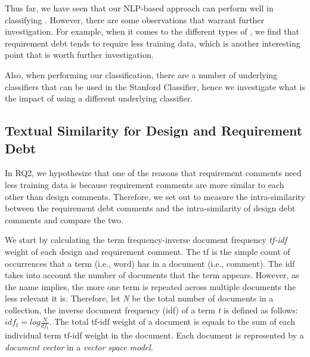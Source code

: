 Thus far, we have seen that our NLP-based approach can perform well in classifying \SATD. However, there are some observations that warrant further investigation. For example, when it comes to the different types of \SATD, we find that requirement debt tends to require less training data, which is another interesting point that is worth further investigation. 


Also, when performing our classification, there are a number of underlying classifiers that can be used in the Stanford Classifier, hence we investigate what is the impact of using a different underlying classifier. 


\subsection{Textual Similarity for Design and Requirement Debt}

In RQ2, we hypothesize that one of the reasons that requirement \SATD comments need less training data is because requirement \SATD comments are more similar to each other than design \SATD comments. Therefore, we set out to measure the intra-similarity between the requirement debt comments and the intra-similarity of design debt comments and compare the two.

We start by calculating the term frequency-inverse document frequency \textit{tf-idf} weight of each design and requirement \SATD comment. The tf is the simple count of occurrences that a term (i.e., word) has in a document (i.e., comment). The idf takes into account the number of documents that the term appears. However, as the name implies, the more one term is repeated across multiple documents the less relevant it is. Therefore, let \textit{N} be the total number of documents in a collection, the inverse document frequency (idf) of a term \textit{t} is defined as follows: \(idf_{t} = log\frac{N}{df_{t}}\). The total tf-idf weight of a document is equals to the sum of each individual term tf-idf weight in the document. Each document is represented by a \textit{document vector} in a \textit{vector space model}. 

